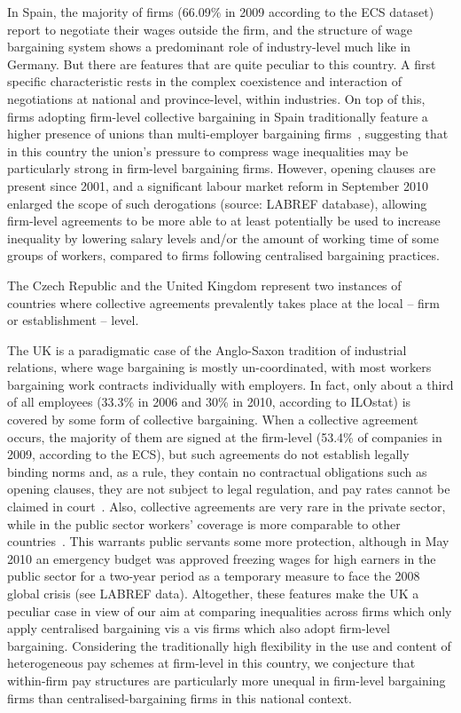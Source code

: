 \documentclass[12pt]{article}
\begin{document}
In Spain, the majority of firms (66.09\% in 2009 according to the ECS
dataset) report to negotiate their wages outside the firm, and the
structure of wage bargaining system shows a predominant role of
industry-level much like in Germany. But there are features that are
quite peculiar to this country. A first specific characteristic rests
in the complex coexistence and interaction of negotiations at national
and province-level, within industries. On top of this, firms adopting
firm-level collective bargaining in Spain traditionally feature a
higher presence of unions than multi-employer bargaining
firms~\citep{plasman.rusinek.ea.2007}, suggesting that in this country
the union's pressure to compress wage inequalities may be particularly
strong in firm-level bargaining firms. However, opening clauses are
present since 2001, and a significant labour market reform in
September 2010 enlarged the scope of such derogations (source: LABREF
database), allowing firm-level agreements to be more able to at least
potentially be used to increase inequality by lowering salary levels
and/or the amount of working time of some groups of workers, compared
to firms following centralised bargaining practices.

The Czech Republic and the United Kingdom represent two instances of
countries where collective agreements prevalently takes place at the
local -- firm or establishment -- level.

The UK is a paradigmatic case of the Anglo-Saxon tradition of
industrial relations, where wage bargaining is mostly un-coordinated,
with most workers bargaining work contracts individually with
employers. In fact, only about a third of all employees (33.3\% in
2006 and 30\% in 2010, according to ILOstat) is covered by some form
of collective bargaining. When a collective agreement occurs, the
majority of them are signed at the firm-level (53.4\% of companies in
2009, according to the ECS), but such agreements do not establish
legally binding norms and, as a rule, they contain no contractual
obligations such as opening clauses, they are not subject to legal
regulation, and pay rates cannot be claimed in
court~\citep{visser2013wage}. Also, collective agreements are very
rare in the private sector, while in the public sector workers'
coverage is more comparable to other countries~\citep{fulton.2013}.
This warrants public servants some more protection, although in May
2010 an emergency budget was approved freezing wages for high earners
in the public sector for a two-year period as a temporary measure to
face the 2008 global crisis (see LABREF data). Altogether, these
features make the UK a peculiar case in view of our aim at comparing
inequalities across firms which only apply centralised bargaining vis a
vis firms which also adopt firm-level bargaining. Considering the
traditionally high flexibility in the use and content of heterogeneous
pay schemes at firm-level in this country, we conjecture that
within-firm pay structures are particularly more unequal in firm-level
bargaining firms than centralised-bargaining firms in this national
context.
\end{document}
